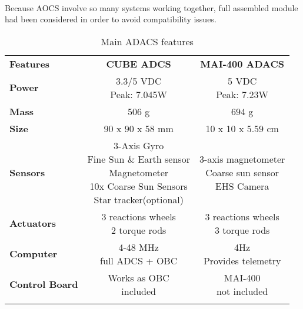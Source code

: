 \paragraph{} Because AOCS involve so many systems working together, full assembled module had been considered in order to avoid compatibility issues. 
\begin{longtable}{| l | c | c |}
	
	\hline
	\rowcolor[gray]{0.60} \multicolumn{3}{|c|}{\textbf{ADACS options }} \\
	\hline
	
	\hline
	\rowcolor[gray]{0.75}	\textbf{Features} &  \textbf{CUBE ADCS} & \textbf{MAI-400 ADACS} \\
	\hline
	
	\cellcolor[gray]{0.85} \textbf{Power} &\makecell{3.3/5 VDC\\ Peak: 7.045W }&  \makecell{5 VDC\\Peak: 7.23W}  \\ 	\hline
	\cellcolor[gray]{0.85} \textbf{Mass} & 506 g& 694 g\\ \hline
	\cellcolor[gray]{0.85} \textbf{Size} & 90 x 90 x 58 mm&10 x 10 x 5.59 cm \\ \hline
	\cellcolor[gray]{0.85} \textbf{Sensors} & \makecell{3-Axis Gyro\\Fine Sun \& Earth sensor \\ Magnetometer\\10x Coarse Sun Sensors \\Star tracker(optional)}& \makecell{3-axis magnetometer \\Coarse sun sensor\\EHS Camera}\\ 	\hline
	\cellcolor[gray]{0.85} \textbf{Actuators} &  \makecell{3 reactions wheels\\2 torque rods} & \makecell{3 reactions wheels\\3 torque rods}\\ 	\hline
	\cellcolor[gray]{0.85} \textbf{Computer} &\makecell{4-48 MHz\\ full ADCS + OBC}  & \makecell{4Hz\\Provides telemetry}\\ \hline
	\cellcolor[gray]{0.85} \textbf{Control Board} & \makecell{Works as OBC\\included}& \makecell{MAI-400\\ not included}\\
	\hline
	
	\caption{Main ADACS features}
	\label{ADACS}
	
\end{longtable}
